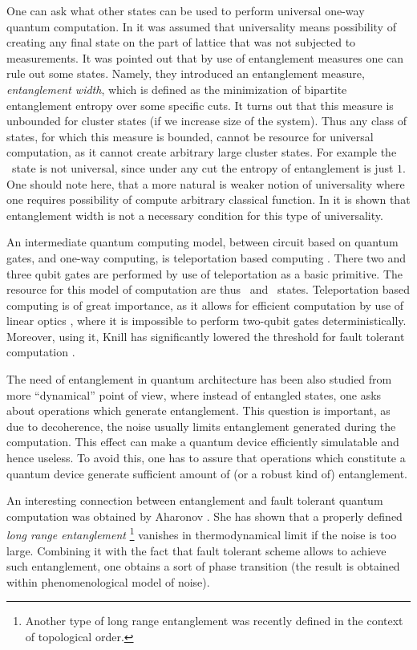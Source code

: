 \documentclass[twocolumn,aps,rmp]{revtex4}
\begin{document}
One can ask what other states can be used to perform universal
one-way quantum computation. In \cite{NestMDB2006-one-way-resource}
it was assumed that universality means possibility
of creating any final state on the part of lattice that
was not subjected to measurements.
It was pointed out that by use of entanglement measures one can
rule out some states. Namely, they introduced an entanglement
measure, {\it entanglement width}, which is defined as the
minimization of bipartite entanglement entropy over some specific
cuts. It turns out that this measure is unbounded for cluster states
(if we increase size of the system). Thus any class of
states, for which this measure is bounded, cannot be resource for
universal computation, as it cannot create arbitrary large cluster
states. For example the \ghz\ state is not universal, since under
any cut the entropy of entanglement is just $1$.
One should note here, that a more natural is weaker notion of universality
where one requires possibility of compute arbitrary classical function. In \cite{GrossE2006-one-way}
it is shown that entanglement width is not a necessary condition
for this type of universality.

An intermediate quantum computing model, between circuit based on
quantum gates, and one-way computing, is teleportation based
computing \cite{GottesmanC1999-Knill}. There two and three
qubit gates are performed by use of teleportation as a basic
primitive. The resource for this model of computation are thus
\eprstates\ and \ghz\ states. Teleportation based computing is of
great importance, as it allows for efficient computation by use of
linear optics \cite{KnillLM2001-lin-opt}, where it is impossible to
perform two-qubit gates
deterministically. Moreover, using it, Knill has significantly
lowered the threshold for fault tolerant computation
\cite{Knill-FT}.

The need of entanglement in quantum architecture has been also studied
from more ``dynamical'' point of view, where instead of entangled
states, one asks about operations which generate entanglement. This
question is important, as due to decoherence, the noise usually limits
entanglement generated during the computation. This effect can make a
quantum device efficiently simulatable and hence useless. To avoid
this, one has to assure that operations which constitute a quantum
device generate sufficient amount of (or a robust kind of)
entanglement.

An interesting connection between entanglement and fault tolerant quantum computation was obtained by Aharonov \cite{dorit-phase}.
She has shown that a properly defined {\it long range entanglement}
\footnote{Another type of long range entanglement was recently defined
\cite{KitaevP2005-top-ent,LevinW2006-top-entr} in the context of topological
order.} vanishes in
thermodynamical limit if the noise is too large. Combining it with the fact that
fault tolerant scheme allows to achieve such entanglement, one obtains a
sort of phase transition (the result is obtained within
phenomenological model of noise).
\end{document}
